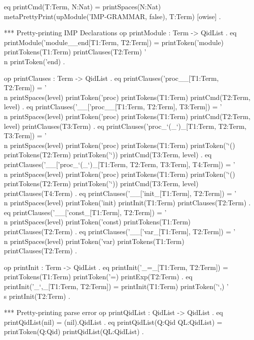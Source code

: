 \documentclass[a4paper,openany]{book}
\begin{document}
 eq printCmd(T:Term, N:Nat) =
    printSpaces(N:Nat) 
    metaPrettyPrint(upModule('IMP-GRAMMAR, false), T:Term) [owise] .

 *** Pretty-printing IMP Declarations
 op printModule : Term -> QidList .
 eq printModule('module__end[T1:Term, T2:Term]) =
    printToken('module) printTokens(T1:Term)
        printClauses(T2:Term)
        '\\n printToken('end) .

 op printClauses : Term -> QidList .
 eq printClauses('proc__[T1:Term, T2:Term]) =
    '\\n printSpaces(level)
    printToken('proc) printTokens(T1:Term)
    printCmd(T2:Term, level) .
 eq printClauses('__['proc__[T1:Term, T2:Term], T3:Term]) =
    '\\n printSpaces(level) printToken('proc) printTokens(T1:Term)
    printCmd(T2:Term, level)
    printClauses(T3:Term) .
 eq printClauses('proc_`(_`)_[T1:Term, T2:Term, T3:Term]) =
    '\\n printSpaces(level)
    printToken('proc) printTokens(T1:Term)
    printToken('`() printTokens(T2:Term) printToken('`))
    printCmd(T3:Term, level) .
 eq printClauses('__['proc_`(_`)_[T1:Term, T2:Term, T3:Term], T4:Term]) =
    '\\n printSpaces(level) printToken('proc) 
    printTokens(T1:Term) printToken('`() printTokens(T2:Term) printToken('`)) 
    printCmd(T3:Term, level)
    printClauses(T4:Term) .
 eq printClauses('__['init_[T1:Term], T2:Term]) =
    '\\n printSpaces(level) printToken('init) 
    printInit(T1:Term) printClauses(T2:Term) .
 eq printClauses('__['const_[T1:Term], T2:Term]) =
    '\\n printSpaces(level) printToken('const) 
    printTokens(T1:Term) printClauses(T2:Term) .
 eq printClauses('__['var_[T1:Term], T2:Term]) =
        '\\n printSpaces(level) printToken('var) 
    printTokens(T1:Term) printClauses(T2:Term) .
 
 op printInit : Term -> QidList .
 eq printInit('_=_[T1:Term, T2:Term]) =
    printTokens(T1:Term) printToken('=) printExp(T2:Term) .
 eq printInit('_`,_[T1:Term, T2:Term]) =
    printInit(T1:Term) printToken('`,) '\\s printInit(T2:Term) .

 *** Pretty-printing parse error
 op printQidList : QidList -> QidList .
 eq printQidList(nil) = (nil).QidList .
 eq printQidList(Q:Qid QL:QidList) = printToken(Q:Qid) printQidList(QL:QidList) .
\end{document}
